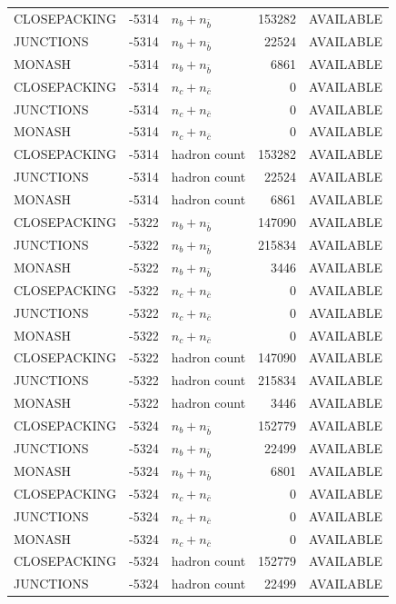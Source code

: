\begin{landscape}
\begin{longtable}{@{}lrlrl@{}}
CLOSEPACKING & -5314 & $n_b+n_{\bar b}$ & \num{153282} & AVAILABLE \\
JUNCTIONS & -5314 & $n_b+n_{\bar b}$ & \num{22524} & AVAILABLE \\
MONASH & -5314 & $n_b+n_{\bar b}$ & \num{6861} & AVAILABLE \\
CLOSEPACKING & -5314 & $n_c+n_{\bar c}$ & \num{0} & AVAILABLE \\
JUNCTIONS & -5314 & $n_c+n_{\bar c}$ & \num{0} & AVAILABLE \\
MONASH & -5314 & $n_c+n_{\bar c}$ & \num{0} & AVAILABLE \\
CLOSEPACKING & -5314 & hadron count & \num{153282} & AVAILABLE \\
JUNCTIONS & -5314 & hadron count & \num{22524} & AVAILABLE \\
MONASH & -5314 & hadron count & \num{6861} & AVAILABLE \\
CLOSEPACKING & -5322 & $n_b+n_{\bar b}$ & \num{147090} & AVAILABLE \\
JUNCTIONS & -5322 & $n_b+n_{\bar b}$ & \num{215834} & AVAILABLE \\
MONASH & -5322 & $n_b+n_{\bar b}$ & \num{3446} & AVAILABLE \\
CLOSEPACKING & -5322 & $n_c+n_{\bar c}$ & \num{0} & AVAILABLE \\
JUNCTIONS & -5322 & $n_c+n_{\bar c}$ & \num{0} & AVAILABLE \\
MONASH & -5322 & $n_c+n_{\bar c}$ & \num{0} & AVAILABLE \\
CLOSEPACKING & -5322 & hadron count & \num{147090} & AVAILABLE \\
JUNCTIONS & -5322 & hadron count & \num{215834} & AVAILABLE \\
MONASH & -5322 & hadron count & \num{3446} & AVAILABLE \\
CLOSEPACKING & -5324 & $n_b+n_{\bar b}$ & \num{152779} & AVAILABLE \\
JUNCTIONS & -5324 & $n_b+n_{\bar b}$ & \num{22499} & AVAILABLE \\
MONASH & -5324 & $n_b+n_{\bar b}$ & \num{6801} & AVAILABLE \\
CLOSEPACKING & -5324 & $n_c+n_{\bar c}$ & \num{0} & AVAILABLE \\
JUNCTIONS & -5324 & $n_c+n_{\bar c}$ & \num{0} & AVAILABLE \\
MONASH & -5324 & $n_c+n_{\bar c}$ & \num{0} & AVAILABLE \\
CLOSEPACKING & -5324 & hadron count & \num{152779} & AVAILABLE \\
JUNCTIONS & -5324 & hadron count & \num{22499} & AVAILABLE \\

\end{longtable}
\end{landscape}
